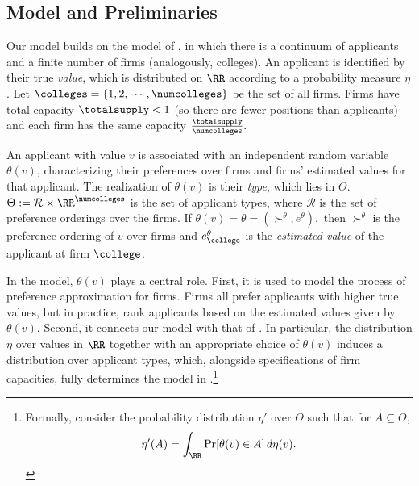 \documentclass[10pt]{article}
\begin{document}
\begin{ReviewVerbatim}
\section{Model and Preliminaries}
Our model builds on the model of \cite{azevedo2016supply}, in which there is a continuum of applicants and a finite number of firms (analogously, colleges). An applicant is identified by their true \textit{value}, which is distributed on $\RR$ according to a probability measure $\eta$. Let $\colleges = \{1, 2, \cdots, \numcolleges\}$ be the set of all firms. Firms have total capacity $\totalsupply < 1$ (so there are fewer positions than applicants) and each firm has the same capacity $\frac{\totalsupply}{\numcolleges}.$

An applicant with value $v$ is associated with an independent random variable $\theta(v)$, characterizing their preferences over firms and firms' estimated values for that applicant. The realization of $\theta(v)$ is their \textit{type}, which lies in $\Theta$. $\Theta := \mathcal{R} \times \RR^\numcolleges$ is the set of applicant types, where $\mathcal{R}$ is the set of preference orderings over the firms. If $\theta(v) = \theta = (\succ^\theta, e^\theta),$ then $\succ^\theta$ is the preference ordering of $v$ over firms and $e^\theta_\college$ is the \textit{estimated value} of the applicant at firm $\college$.

In the model, $\theta(v)$ plays a central role. First, it is used to model the process of preference approximation for firms. Firms all prefer applicants with higher true values, but in practice, rank applicants based on the estimated values given by $\theta(v)$. Second, it connects our model with that of \cite{azevedo2016supply}. In particular, the distribution $\eta$ over values in $\RR$ together with an appropriate choice of $\theta(v)$ induces a distribution over applicant types, which, alongside specifications of firm capacities, fully determines the model in \cite{azevedo2016supply}.\footnote{Formally, consider the probability distribution $\eta'$ over $\Theta$ such that for $A\subseteq \Theta$,
\begin{equation}
    \eta'(A) = \int_\RR \Pr[\theta(v)\in A]\,d\eta(v).
\end{equation}}


\end{ReviewVerbatim}
\end{document}
